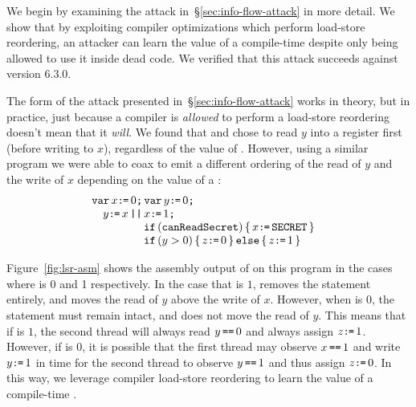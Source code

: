 We begin by examining the attack in~\S\ref{sec:info-flow-attack} in
more detail.
We show that by exploiting compiler optimizations which perform
load-store reordering, an attacker can learn the value of a compile-time
{\SEC} despite only being allowed to use it inside dead code.
We verified that this attack succeeds against {\GCC} version 6.3.0.

The form of the attack presented in~\S\ref{sec:info-flow-attack} works in
theory, but in practice, just because a compiler is \emph{allowed} to perform a
load-store reordering doesn't mean that it \emph{will}.
We found that {\GCC} and {\CLANG} chose to read $y$ into a
register first (before writing to $x$), regardless of the value of
{\SEC}.
However, using a similar program we were able to coax {\GCC} to emit a
different ordering of the read of $y$ and the write of $x$ depending
on the value of a {\SEC}:
\[\begin{array}[t]{@{}l}
  \VAR x\GETS0\SEMI \VAR y\GETS0\SEMI\\\quad
    y\GETS x
  \PAR\begin{array}[t]{@{}l}
    x\GETS 1\SEMI\\
    \IF(\texttt{canReadSecret})\THEN x\GETS\SEC\FI\\
    \IF(y > 0)\THEN z\GETS 0 \ELSE z\GETS 1\FI
\end{array}\end{array}\]

Figure~\ref{fig:lsr-asm} shows the assembly output of {\GCC} on this program in the cases
where {\SEC} is 0 and 1 respectively.
In the case that {\SEC} is $1$, {\GCC} removes the \IF
statement entirely, and moves the read of $y$ above the write of $x$.
However, when {\SEC} is $0$, the \IF statement must remain
intact, and {\GCC} does not move the read of $y$.
This means that if {\SEC} is $1$, the second thread will always
read $y\,\texttt{==}\,0$ and always assign $z\texttt{:}\mkern-1mu\texttt{=}\,1$.
However, if {\SEC} is $0$, it is possible that the first thread
may observe $x\,\texttt{==}\,1$ and write $y\texttt{:}\mkern-1mu\texttt{=}\,1$ in time for the second thread
to observe $y\,\texttt{==}\,1$ and thus assign $z\texttt{:}\mkern-1mu\texttt{=}\,0$.
In this way, we leverage compiler load-store reordering to learn the value of
a compile-time {\SEC}.

